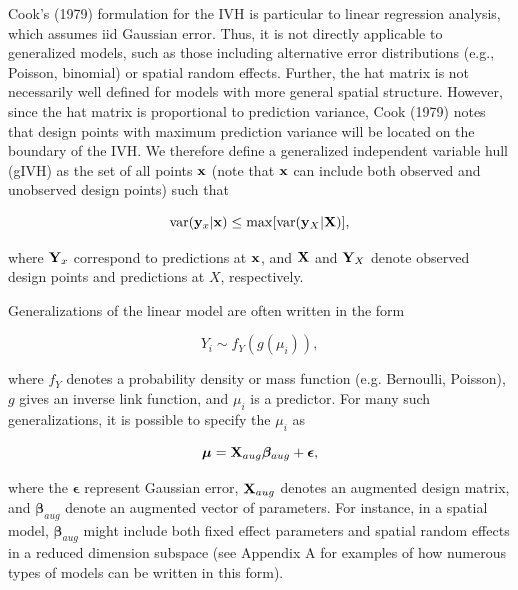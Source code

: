 \documentclass[12pt,english]{article}
\begin{document}
\begin{spacing}{1.9}
Cook's (1979) formulation for the IVH is particular to linear regression analysis, which assumes iid Gaussian error. Thus, it is not directly applicable to generalized models, such as those including alternative error distributions (e.g., Poisson, binomial) or spatial random effects.  Further, the hat matrix is not necessarily well defined for models with more general spatial structure. However, since the hat matrix is proportional to prediction variance, Cook (1979) notes that design points with maximum prediction variance will be located on the boundary of the IVH.  We therefore define a generalized independent variable hull (gIVH) as the set of all points ${\bf x}$ (note that ${\bf x}$ can include both observed and unobserved design points) such that
\begin{linenomath*}
\begin{equation}
  \label{eq:gIVH}
  {\rm var}({\bf y}_x | {\bf x}) \le {\rm max} [{\rm var}({\bf y}_X | {\bf X})],
\end{equation}
\end{linenomath*}
where ${\bf Y}_x$ correspond to predictions at ${\bf x}$, and ${\bf X}$ and ${\bf Y}_X$ denote observed design points and predictions at $X$, respectively.

Generalizations of the linear model are often written in the form
\begin{linenomath*}
\begin{equation}
  Y_i \sim f_Y(g(\mu_i)),
\end{equation}
\end{linenomath*}
where $f_Y$ denotes a probability density or mass function (e.g. Bernoulli, Poisson), $g$ gives an inverse link function, and
$\mu_i$ is a predictor.  For many such generalizations, it is possible to specify the $\mu_i$ as
\begin{linenomath*}
\begin{equation}
  \boldsymbol{\mu} = {\bf X}_{aug}\boldsymbol{\beta}_{aug} + \boldsymbol{\epsilon},
  \label{eq:mu-aug}
\end{equation}
\end{linenomath*}
where the $\boldsymbol{\epsilon}$ represent Gaussian error, ${\bf X}_{aug}$ denotes an augmented design matrix, and $\boldsymbol{\beta}_{aug}$ denote an augmented vector of parameters.  For instance, in a spatial model, $\boldsymbol{\beta}_{aug}$ might include both fixed effect parameters and spatial random effects in a reduced dimension subspace (see Appendix A for examples of how numerous types of models can be written in this form).


\end{spacing}
\end{document}
